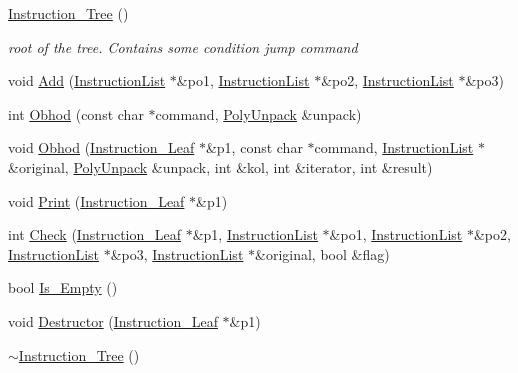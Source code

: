 \begin{DoxyCompactItemize}
\item 
\hyperlink{classInstruction__Tree_a5d61b36f6c10b48c4ec6d844226a81eb}{Instruction\_\-Tree} ()
\begin{DoxyCompactList}\small\item\em root of the tree. Contains some condition jump command \item\end{DoxyCompactList}\item 
void \hyperlink{classInstruction__Tree_a4c51fc44c6c0fd0d145900231fa1f059}{Add} (\hyperlink{structInstructionList}{InstructionList} $\ast$\&po1, \hyperlink{structInstructionList}{InstructionList} $\ast$\&po2, \hyperlink{structInstructionList}{InstructionList} $\ast$\&po3)
\item 
int \hyperlink{classInstruction__Tree_adef0585fdc4173cbd6baabd5bec79a56}{Obhod} (const char $\ast$command, \hyperlink{classPolyUnpack}{PolyUnpack} \&unpack)
\item 
void \hyperlink{classInstruction__Tree_afc8fc8d76c6ab64eedf78c551972f2df}{Obhod} (\hyperlink{structInstruction__Leaf}{Instruction\_\-Leaf} $\ast$\&p1, const char $\ast$command, \hyperlink{structInstructionList}{InstructionList} $\ast$\&original, \hyperlink{classPolyUnpack}{PolyUnpack} \&unpack, int \&kol, int \&iterator, int \&result)
\item 
void \hyperlink{classInstruction__Tree_ae791340bf25bcf1bf72072d6cc9a5d3e}{Print} (\hyperlink{structInstruction__Leaf}{Instruction\_\-Leaf} $\ast$\&p1)
\item 
int \hyperlink{classInstruction__Tree_ad9da870498b9d71cbb5a720253016712}{Check} (\hyperlink{structInstruction__Leaf}{Instruction\_\-Leaf} $\ast$\&p1, \hyperlink{structInstructionList}{InstructionList} $\ast$\&po1, \hyperlink{structInstructionList}{InstructionList} $\ast$\&po2, \hyperlink{structInstructionList}{InstructionList} $\ast$\&po3, \hyperlink{structInstructionList}{InstructionList} $\ast$\&original, bool \&flag)
\item 
bool \hyperlink{classInstruction__Tree_accb3231bdc3392cc49a8f6b6c79c82a1}{Is\_\-Empty} ()
\item 
void \hyperlink{classInstruction__Tree_a3ede055013058a1f9abefb5f50c02423}{Destructor} (\hyperlink{structInstruction__Leaf}{Instruction\_\-Leaf} $\ast$\&p1)
\item 
\hyperlink{classInstruction__Tree_abbd3825561af346def028707498fbd9b}{$\sim$Instruction\_\-Tree} ()
\end{DoxyCompactItemize}



